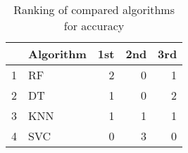 \begin{table}
\footnotesize
\caption{Ranking of compared algorithms for accuracy}
\label{tab:places accuracy}
\begin{tabular}{llrrr}
\hline
 & Algorithm & 1st & 2nd & 3rd \\
\hline
1 & RF & 2 & 0 & 1 \\
2 & DT & 1 & 0 & 2 \\
3 & KNN & 1 & 1 & 1 \\
4 & SVC & 0 & 3 & 0 \\
\hline
\end{tabular}
\end{table}
